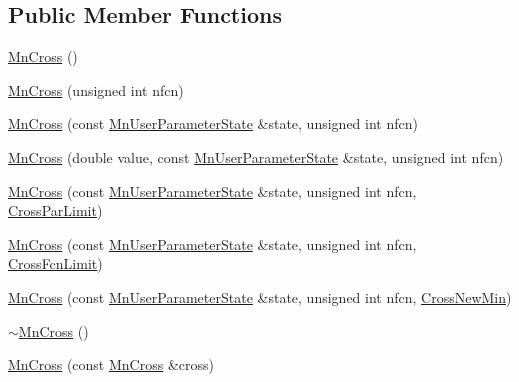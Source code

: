 \subsection*{Public Member Functions}
\begin{DoxyCompactItemize}
\item 
\mbox{\hyperlink{classROOT_1_1Minuit2_1_1MnCross_a34d52c2c171319eb9f25c688ab8021f0}{Mn\+Cross}} ()
\item 
\mbox{\hyperlink{classROOT_1_1Minuit2_1_1MnCross_a7f93187035c85b5c2adf78d00c0d0052}{Mn\+Cross}} (unsigned int nfcn)
\item 
\mbox{\hyperlink{classROOT_1_1Minuit2_1_1MnCross_acbfb3f4507d15112537609f68ad36c29}{Mn\+Cross}} (const \mbox{\hyperlink{classROOT_1_1Minuit2_1_1MnUserParameterState}{Mn\+User\+Parameter\+State}} \&state, unsigned int nfcn)
\item 
\mbox{\hyperlink{classROOT_1_1Minuit2_1_1MnCross_a4b4c9d92105b2517789094d86eecee57}{Mn\+Cross}} (double value, const \mbox{\hyperlink{classROOT_1_1Minuit2_1_1MnUserParameterState}{Mn\+User\+Parameter\+State}} \&state, unsigned int nfcn)
\item 
\mbox{\hyperlink{classROOT_1_1Minuit2_1_1MnCross_aea436e84ebb882f376cfdc90b8846660}{Mn\+Cross}} (const \mbox{\hyperlink{classROOT_1_1Minuit2_1_1MnUserParameterState}{Mn\+User\+Parameter\+State}} \&state, unsigned int nfcn, \mbox{\hyperlink{classROOT_1_1Minuit2_1_1MnCross_1_1CrossParLimit}{Cross\+Par\+Limit}})
\item 
\mbox{\hyperlink{classROOT_1_1Minuit2_1_1MnCross_ad306883aae64c6bd2d4acd8adbb28c9e}{Mn\+Cross}} (const \mbox{\hyperlink{classROOT_1_1Minuit2_1_1MnUserParameterState}{Mn\+User\+Parameter\+State}} \&state, unsigned int nfcn, \mbox{\hyperlink{classROOT_1_1Minuit2_1_1MnCross_1_1CrossFcnLimit}{Cross\+Fcn\+Limit}})
\item 
\mbox{\hyperlink{classROOT_1_1Minuit2_1_1MnCross_a8508fcf20167952cb8f53427d348e2dc}{Mn\+Cross}} (const \mbox{\hyperlink{classROOT_1_1Minuit2_1_1MnUserParameterState}{Mn\+User\+Parameter\+State}} \&state, unsigned int nfcn, \mbox{\hyperlink{classROOT_1_1Minuit2_1_1MnCross_1_1CrossNewMin}{Cross\+New\+Min}})
\item 
\mbox{\hyperlink{classROOT_1_1Minuit2_1_1MnCross_a34f9825f828387bc92e6e7aaac8ced84}{$\sim$\+Mn\+Cross}} ()
\item 
\mbox{\hyperlink{classROOT_1_1Minuit2_1_1MnCross_ac4526685d7655e69378fd2cc844d0e55}{Mn\+Cross}} (const \mbox{\hyperlink{classROOT_1_1Minuit2_1_1MnCross}{Mn\+Cross}} \&cross)
\item 

\end{DoxyCompactItemize}
